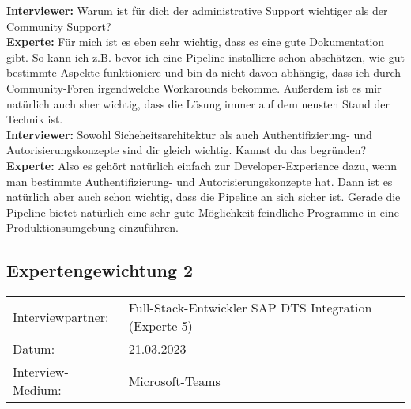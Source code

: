 \begin{linenumbers}
            \textbf{Interviewer:} Warum ist für dich der administrative Support wichtiger als der Community-Support?\\
            \textbf{Experte:} Für mich ist es eben sehr wichtig, dass es eine gute Dokumentation gibt. So kann ich z.B. bevor ich eine Pipeline installiere schon abschätzen, wie gut bestimmte Aspekte funktioniere und bin da nicht davon abhängig, dass ich durch Community-Foren irgendwelche Workarounds bekomme. Außerdem ist es mir natürlich auch sher wichtig, dass die Lösung immer auf dem neusten Stand der Technik ist.\\
            \textbf{Interviewer:} Sowohl Sicheheitsarchitektur als auch Authentifizierung- und Autorisierungskonzepte sind dir gleich wichtig. Kannst du das begründen?\\
            \textbf{Experte:} Also es gehört natürlich einfach zur Developer-Experience dazu, wenn man bestimmte Authentifizierung- und Autorisierungskonzepte hat. Dann ist es natürlich aber auch schon wichtig, dass die Pipeline an sich sicher ist. Gerade die Pipeline bietet natürlich eine sehr gute Möglichkeit feindliche Programme in eine Produktionsumgebung einzuführen.\\
    \end{linenumbers}
    

    
    \newpage
    \subsection{Expertengewichtung 2}
            \begin{tabular}{ l l }
        Interviewpartner: & Full-Stack-Entwickler SAP DTS Integration (Experte 5)\\
        Datum: & 21.03.2023\\
        Interview-Medium: & Microsoft-Teams\\
\end{tabular}
\begin{center}
    \begin{figure}[H]
        \centering
        \label{fig:CEA}
    \end{figure}	
\end{center}
\begin{center}
    \begin{figure}[H]
        \centering
        \label{fig:CEA}
    \end{figure}	
\end{center}

